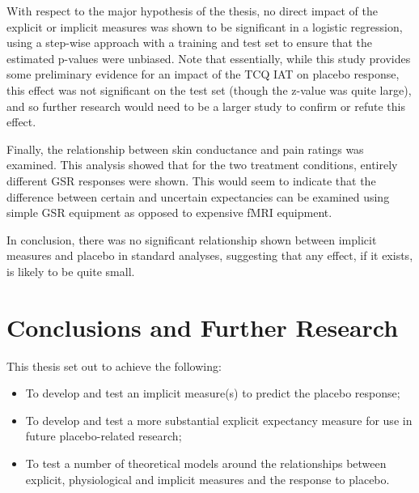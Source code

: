 With respect to the major hypothesis of the thesis, no direct impact of the explicit or implicit measures was shown to be significant in a logistic regression, using a step-wise approach with a training and test set to ensure that the estimated p-values were unbiased. Note that essentially, while this study provides some preliminary evidence for an impact of the TCQ IAT on placebo response, this effect was not significant on the test set (though the z-value was quite large), and so further research would need to be a larger study to confirm or refute this effect. 


Finally, the relationship between skin conductance and pain ratings was examined. This analysis showed that for the two treatment conditions, entirely different GSR responses were shown. This would seem to indicate that the difference between certain and uncertain expectancies can be examined using simple GSR equipment as opposed to expensive fMRI equipment. 

In conclusion, there was no significant relationship shown between implicit measures and placebo in standard analyses, suggesting that any effect, if it exists, is likely to be quite small. 

\section{Conclusions and Further Research}

This thesis set out to achieve the following:

\begin{itemize}
\item To develop and test an implicit measure(s) to predict the placebo response;
\item To develop and test a more substantial explicit expectancy measure for use in future placebo-related research;
\item To test a number of theoretical models around the relationships between explicit, physiological and implicit measures and the response to placebo.
\end{itemize}

